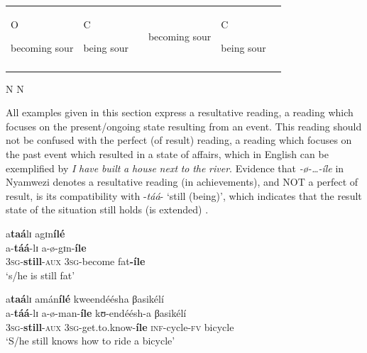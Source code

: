 \documentclass[output=paper]{langscibook}
\begin{document}
    \z
\z
    
\begin{table}
\begin{tabularx}{\textwidth}{XXXXXX}
\lsptoprule
\hhline{--~~--}
 O\par


becoming sour & C\par

being sour &  & %

 becoming sour & C\par

\par

 being sour\\
\hhline{--~~--}
\end{tabularx}
                N             N 
                
\end{table} 

                
All examples given in this section express a resultative reading, a reading which focuses on the present/ongoing state resulting from an event. This reading should not be confused with the perfect (of result) reading, a reading which focuses on the past event which resulted in a state of affairs, which in English can be exemplified by \textit{I} \textit{have} \textit{built} \textit{a} \textit{house} \textit{next} \textit{to} \textit{the} \textit{river}. Evidence that \textit{-ø}\textit{-…-íle} in Nyamwezi denotes a resultative reading (in achievements), and NOT a perfect of result, is its compatibility with -\textit{táá}- ‘still (being)’, which indicates that the result state of the situation still holds (is extended) . 

\ea \label{ex:kanijo:17}
\ea
    \glll a\textbf{taá}lɪ     agɪn\textbf{ílé}\\ 
    a-\textbf{táá}-lɪ   a-ø-gɪn-\textbf{íle}\\
    3\textsc{sg}-\textbf{still}-\textsc{aux} 3\textsc{sg}-become fat\textbf{-íle}\\
    \glt ‘s/he is still fat’

\ex  
    \glll a\textbf{taá}lɪ    amán\textbf{ílé}    kweendéésha βasikélí\\
    a-\textbf{táá}-lɪ       a-ø-man-\textbf{íle}    kʊ-endéésh-a βasikélí\\
    3\textsc{sg}-\textbf{still}-\textsc{aux} 3\textsc{sg}-get.to.know-\textbf{íle} \textsc{inf}-cycle-\textsc{fv}   bicycle \\
    \glt ‘S/he still knows how to ride a bicycle’
\z
\z
\end{document}
